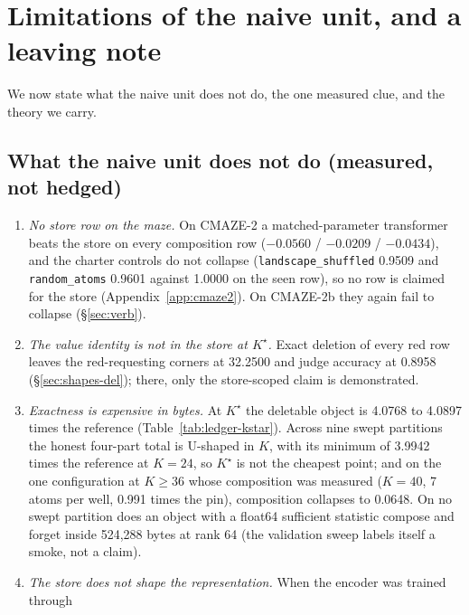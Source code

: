 \documentclass{article} %
\newcommand{\Kstar}{\ensuremath{K^{\star}}}
\begin{document}
\section{Limitations of the naive unit, and a leaving note}
\label{sec:limits}

We now state what the naive unit does not do, the one measured clue, and the theory we carry.
\subsection{What the naive unit does not do (measured, not hedged)}
\label{sec:limits-list}

\begin{enumerate}[leftmargin=*,itemsep=1pt]
\item \emph{No store row on the maze.} On CMAZE-2 a matched-parameter transformer beats the
  store on every composition row ($-0.0560$ / $-0.0209$ / $-0.0434$), and the charter controls do
  not collapse (\texttt{landscape\_shuffled} 0.9509 and \texttt{random\_atoms} 0.9601 against
  1.0000 on the seen row), so no row is claimed for the store (Appendix~\ref{app:cmaze2}). On CMAZE-2b they again fail to collapse (\S\ref{sec:verb}). %
\item \emph{The value identity is not in the store at $\Kstar$.} Exact deletion of every red
  row leaves the red-requesting corners at 32.2500 and judge accuracy at 0.8958
  (\S\ref{sec:shapes-del}); there, only the store-scoped claim is demonstrated.
\item \emph{Exactness is expensive in bytes.} At $\Kstar$ the deletable object is 4.0768 to 4.0897
  times the reference (Table~\ref{tab:ledger-kstar}). Across nine swept partitions the honest
  four-part total is U-shaped in $K$, with its minimum of 3.9942 times the reference at $K=24$, so
  $\Kstar$ is not the cheapest point; and on the one configuration at $K\ge36$ whose composition
  was measured ($K=40$, 7 atoms per well, 0.991 times the pin), composition collapses to 0.0648.
  On no swept partition does an object with a float64 sufficient statistic compose and forget inside 524,288 bytes at rank
  64 (the validation sweep labels itself a smoke, not a claim).
\item \emph{The store does not shape the representation.} When the encoder was trained through

\end{enumerate}
\end{document}
